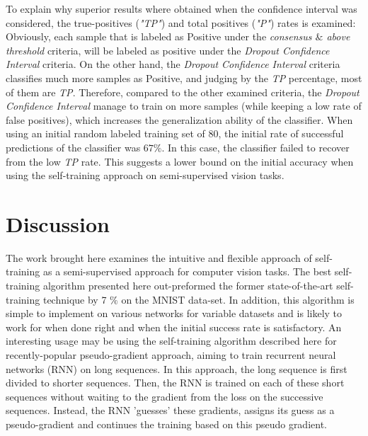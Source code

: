 \documentclass[conference, letterpaper]{IEEEtran}
\begin{document}
To explain why superior results where obtained when the confidence interval was considered, the true-positives (\textit{"TP"}) and total positives (\textit{"P"}) rates is examined: Obviously, each sample that is labeled as Positive under the \textit{consensus $\&$ above threshold} criteria, will be labeled as positive under the \textit{Dropout Confidence Interval} criteria. On the other hand, the \textit{Dropout Confidence Interval} criteria classifies much more samples as Positive, and judging by the \textit{TP} percentage, most of them are \textit{TP}. Therefore, compared to the other examined criteria, the \textit{Dropout Confidence Interval} manage to train on more samples (while keeping a low rate of false positives), which increases the generalization ability of the classifier. When using an initial random labeled training set of 80, the initial rate of successful predictions of the classifier was $67\%$. In this case, the classifier failed to recover from the low \textit{TP} rate. This suggests a lower bound on the initial accuracy when using the self-training approach on semi-supervised vision tasks.
\section{Discussion}
The work brought here examines the intuitive and flexible approach of self-training as a semi-supervised approach for computer vision tasks. 
The best self-training algorithm presented here out-preformed the former state-of-the-art self-training technique by 7 $\%$ on the MNIST data-set. In addition, this algorithm is simple to implement on various networks for variable datasets and is likely to work for when done right and when the initial success rate is satisfactory. An interesting usage may be using the self-training algorithm described here for recently-popular pseudo-gradient approach, aiming to train recurrent neural networks (RNN) on long sequences. In this approach, the long sequence is first divided to shorter sequences. Then, the RNN is trained on each of these short sequences without waiting to the gradient from the loss on the successive sequences. Instead, the RNN 'guesses' these gradients, assigns its guess as a pseudo-gradient and continues the training based on this pseudo gradient.
\end{document}
